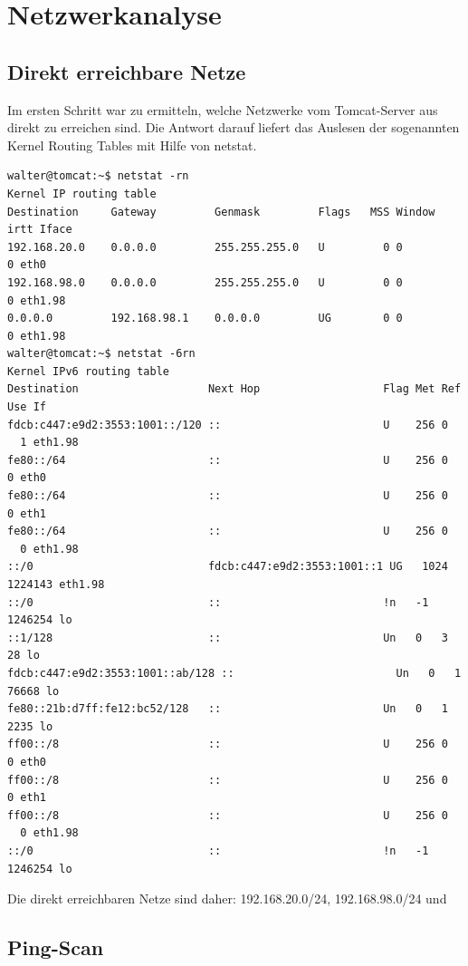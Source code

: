 \section{Netzwerkanalyse}

\subsection{Direkt erreichbare Netze}

Im ersten Schritt war zu ermitteln, welche Netzwerke vom Tomcat-Server aus direkt zu erreichen sind. Die Antwort darauf liefert das Auslesen der sogenannten Kernel Routing Tables mit Hilfe von netstat.

\begin{lstlisting}
walter@tomcat:~$ netstat -rn
Kernel IP routing table
Destination     Gateway         Genmask         Flags   MSS Window  irtt Iface
192.168.20.0    0.0.0.0         255.255.255.0   U         0 0          0 eth0
192.168.98.0    0.0.0.0         255.255.255.0   U         0 0          0 eth1.98
0.0.0.0         192.168.98.1    0.0.0.0         UG        0 0          0 eth1.98
walter@tomcat:~$ netstat -6rn
Kernel IPv6 routing table
Destination                    Next Hop                   Flag Met Ref Use If
fdcb:c447:e9d2:3553:1001::/120 ::                         U    256 0
  1 eth1.98
fe80::/64                      ::                         U    256 0     0 eth0
fe80::/64                      ::                         U    256 0     0 eth1
fe80::/64                      ::                         U    256 0
  0 eth1.98
::/0                           fdcb:c447:e9d2:3553:1001::1 UG   1024
1224143 eth1.98
::/0                           ::                         !n   -1  1246254 lo
::1/128                        ::                         Un   0   3    28 lo
fdcb:c447:e9d2:3553:1001::ab/128 ::                         Un   0   1 76668 lo
fe80::21b:d7ff:fe12:bc52/128   ::                         Un   0   1  2235 lo
ff00::/8                       ::                         U    256 0     0 eth0
ff00::/8                       ::                         U    256 0     0 eth1
ff00::/8                       ::                         U    256 0
  0 eth1.98
::/0                           ::                         !n   -1  1246254 lo
\end{lstlisting}

Die direkt erreichbaren Netze sind daher: 192.168.20.0/24, 192.168.98.0/24 und 

\subsection{Ping-Scan}

